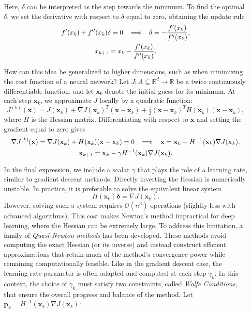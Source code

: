 \documentclass{article}
\numberwithin{equation}{subsection}
\begin{document}
Here, $\delta$ can be interpreted as the step towards the minimum. To find the optimal $\delta$, we set the derivative with respect to $\delta$ equal to zero, obtaining the update rule
\begin{gather}
    f'(x_k) + f''(x_k)\delta = 0 
    \;\;\implies\;\; 
    \delta = -\frac{f'(x_k)}{f''(x_k)}, \notag \\
    x_{k+1} = x_k - \frac{f'(x_k)}{f''(x_k)}.
\end{gather}

How can this idea be generalized to higher dimensions, such as when minimizing the cost function of a neural network? Let $J : A \subseteq \mathbb{R}^d \to \mathbb{R}$ be a twice continuously differentiable function, and let $\mathbf{x}_0$ denote the initial guess for its minimum. At each step $\mathbf{x}_k$, we approximate $J$ locally by a quadratic function:
\begin{equation*}
    J^{(k)}(\mathbf{x}) = J(\mathbf{x}_k) 
    + \nabla J(\mathbf{x}_k)^T (\mathbf{x} - \mathbf{x}_k) 
    + \tfrac{1}{2} (\mathbf{x} - \mathbf{x}_k)^T H(\mathbf{x}_k)(\mathbf{x} - \mathbf{x}_k),
\end{equation*}
where $H$ is the Hessian matrix. Differentiating with respect to $\mathbf{x}$ and setting the gradient equal to zero gives
\begin{gather}
    \nabla J^{(k)}(\mathbf{x}) 
    = \nabla J(\mathbf{x}_k) + H(\mathbf{x}_k)(\mathbf{x} - \mathbf{x}_k) = 0 \notag \;\; \implies\;\; \mathbf{x} = \mathbf{x}_k - H^{-1}(\mathbf{x}_k)\nabla J(\mathbf{x}_k), \\
    \mathbf{x}_{k+1} = \mathbf{x}_k - \gamma H^{-1}(\mathbf{x}_k)\nabla J(\mathbf{x}_k). \notag
\end{gather}

In the final expression, we include a scalar $\gamma$ that plays the role of a learning rate, similar to gradient descent methods. Directly inverting the Hessian is numerically unstable. In practice, it is preferable to solve the equivalent linear system
\[
    H(\mathbf{x}_k)\boldsymbol{\delta} = \nabla J(\mathbf{x}_k).
\]
However, solving such a system requires $\mathcal{O}(n^3)$ operations (slightly less with advanced algorithms). This cost makes Newton’s method impractical for deep learning, where the Hessian can be extremely large. To address this limitation, a family of \emph{Quasi-Newton methods} has been developed. These methods avoid computing the exact Hessian (or its inverse) and instead construct efficient approximations that retain much of the method’s convergence power while remaining computationally feasible. Like in the gradient descent case, the learning rate parameter is often adapted and computed at each step $\gamma_k$. In this context, the choice of $\gamma_k$ must satisfy two constraints, called \textit{Wolfe Conditions}, that ensure the overall progress and balance of the method. Let $\textbf{p}_k = H^{-1}(\textbf{x}_k)\nabla J(\textbf{x}_k)$:
\end{document}
